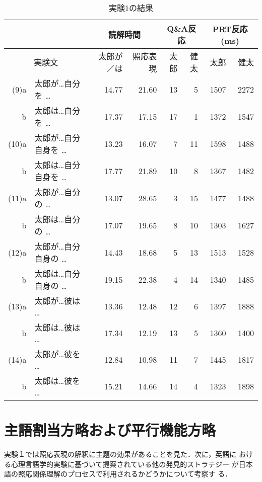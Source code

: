 \begin{table}
\begin{center}
\caption{実験1の結果}
\label{table:exam1r}
\begin{tabular}{|rl|r|r|r|r|r|r|} \hline
 \multicolumn{2}{|c|}{}&
 \multicolumn{2}{c|}{読解時間} &
 \multicolumn{2}{c|}{Q\&A反応} &
 \multicolumn{2}{c|}{PRT反応(ms)} \\ \hline
 \multicolumn{2}{|c|}{実験文} & 
  太郎が／は & 照応表現 & 太郎 & 健太 & 太郎 & 健太 \\ \hline
 (9)a  & 太郎が\ldots 自分を \ldots & 14.77 & 21.60 & 13 & 5 & 1507 & 2272\\
    b  & 太郎は\ldots 自分を \ldots & 17.37 & 17.15 & 17 & 1 & 1372 & 1547\\
 (10)a & 太郎が\ldots 自分自身を \ldots &13.23 & 16.07 & 7 & 11 & 1598 &1488\\
     b & 太郎は\ldots 自分自身を \ldots &17.77 & 21.89 & 10& 8 & 1367 &1482\\
 (11)a & 太郎が\ldots 自分の \ldots & 13.07 & 28.65 & 3 & 15 & 1477 & 1488\\
     b & 太郎は\ldots 自分の \ldots & 17.07 & 19.65 & 8 & 10 & 1303 & 1627\\
 (12)a & 太郎が\ldots 自分自身の \ldots & 14.43 &	18.68 & 5 & 13
 & 1513 & 1528\\
     b & 太郎は\ldots 自分自身の \ldots & 19.15 & 22.38 & 4 & 14 &
 1340 & 1485\\
 (13)a & 太郎が\ldots 彼は \ldots & 13.36	& 12.48	& 12 & 6 &
 1397	& 1888\\

     b & 太郎は\ldots 彼は \ldots & 17.34	& 12.19	& 13 & 5 &
 1360	& 1400\\

 (14)a & 太郎が\ldots 彼を \ldots & 12.84	& 10.98	& 11 & 7 &
 1445	& 1817\\

     b & 太郎は\ldots 彼を \ldots & 15.21	& 14.66	& 14 & 4 &
 1323	& 1898\\ \hline
\end{tabular}
\end{center}

\end{table}

\section{主語割当方略および平行機能方略}

  実験１では照応表現の解釈に主題の効果があることを見た．次に，英語に
  おける心理言語学的実験に基づいて提案されている他の発見的ストラテジー
  が日本語の照応関係理解のプロセスで利用されるかどうかについて考察す
  る．

